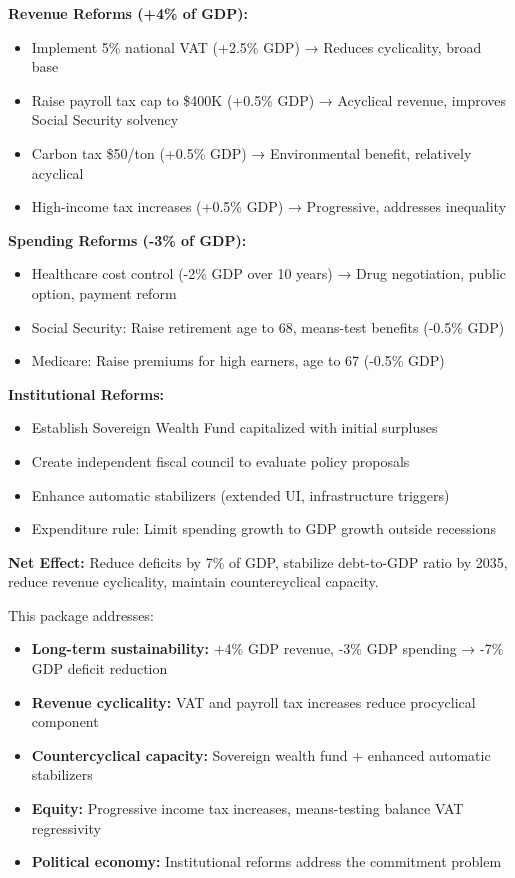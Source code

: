 \documentclass[12pt,letterpaper]{article}
\begin{document}
\begin{tcolorbox}[colback=green!10,colframe=successgreen,title=\textbf{Comprehensive Fiscal Reform Package}]

\textbf{Revenue Reforms (+4\% of GDP):}
\begin{itemize}
    \item Implement 5\% national VAT (+2.5\% GDP) → Reduces cyclicality, broad base
    \item Raise payroll tax cap to \$400K (+0.5\% GDP) → Acyclical revenue, improves Social Security solvency
    \item Carbon tax \$50/ton (+0.5\% GDP) → Environmental benefit, relatively acyclical
    \item High-income tax increases (+0.5\% GDP) → Progressive, addresses inequality
\end{itemize}

\textbf{Spending Reforms (-3\% of GDP):}
\begin{itemize}
    \item Healthcare cost control (-2\% GDP over 10 years) → Drug negotiation, public option, payment reform
    \item Social Security: Raise retirement age to 68, means-test benefits (-0.5\% GDP)
    \item Medicare: Raise premiums for high earners, age to 67 (-0.5\% GDP)
\end{itemize}

\textbf{Institutional Reforms:}
\begin{itemize}
    \item Establish Sovereign Wealth Fund capitalized with initial surpluses
    \item Create independent fiscal council to evaluate policy proposals
    \item Enhance automatic stabilizers (extended UI, infrastructure triggers)
    \item Expenditure rule: Limit spending growth to GDP growth outside recessions
\end{itemize}

\textbf{Net Effect:} Reduce deficits by 7\% of GDP, stabilize debt-to-GDP ratio by 2035, reduce revenue cyclicality, maintain countercyclical capacity.
\end{tcolorbox}

This package addresses:
\begin{itemize}
    \item \textbf{Long-term sustainability:} +4\% GDP revenue, -3\% GDP spending → -7\% GDP deficit reduction
    \item \textbf{Revenue cyclicality:} VAT and payroll tax increases reduce procyclical component
    \item \textbf{Countercyclical capacity:} Sovereign wealth fund + enhanced automatic stabilizers
    \item \textbf{Equity:} Progressive income tax increases, means-testing balance VAT regressivity
    \item \textbf{Political economy:} Institutional reforms address the commitment problem
\end{itemize}
\end{document}
